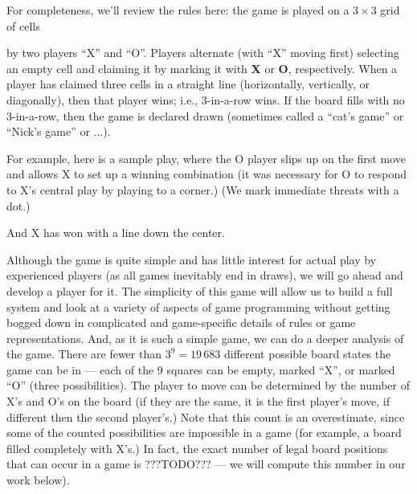 \documentclass[10pt,dvipdfmx]{report}
\let\x=\times
\begin{document}
For completeness, we'll review the rules here:  the game is played on a $3\x3$ grid of cells

\begin{center}\tictactoeboard{,,}{,,}{,,}\end{center}
by two players ``X'' and ``O''.  Players alternate (with ``X'' moving first)
selecting an empty cell and claiming it by marking it with {\bf X} or {\bf O}, respectively.
When a player has claimed three cells in a straight line (horizontally, vertically, or diagonally),
then that player wins; i.e., 3-in-a-row wins.  If the board fills with no 3-in-a-row, then the game
is declared drawn (sometimes called a ``cat's game'' or ``Nick's game'' or ...).

For example, here is a sample play, where the O player slips up on the first move
and allows X to set up a winning combination (it was necessary for O to respond to X's
central play by playing to a corner.)  (We mark immediate threats with a dot.)
\begin{center}
\tictactoeboard{,,}{,,}{,,}
\end{center}
And X has won with a line down the center.

Although the game is quite simple and has little interest for actual play by experienced players
(as all games inevitably end in draws), we will go ahead and develop a player for it.
The simplicity of this game will allow us to build a full system and look at a variety of aspects of
game programming without getting bogged down in complicated and game-specific details
of rules or game representations.  And, as it is such a simple game, we can
do a deeper analysis of the game.  There are fewer than $3^9=19\,683$ different
possible board states the game can be in --- each of the 9 squares can be empty,
marked ``X'', or marked ``O'' (three possibilities).  The player to move can be
determined by the number of X's and O's on the board (if they are the same, it is
the first player's move, if different then the second player's.)  Note that this count
is an overestimate, since some of the counted possibilities are impossible in a game
(for example, a board filled completely with X's.)  In fact, the exact number of
legal board positions that can occur in a game is ???TODO??? --- we will compute this number
in our work below).
\end{document}
